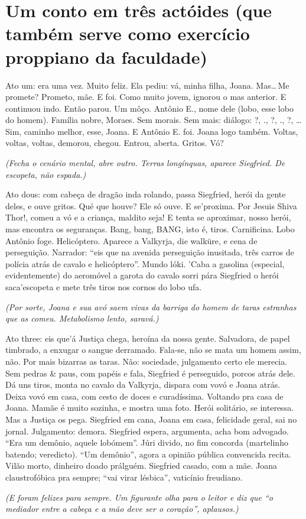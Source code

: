 \chapter[Um conto em três actóides]{Um conto em três actóides (que também serve como exercício proppiano da faculdade)}

Ato um: era uma vez. Muito feliz. Ela pediu: vá, minha filha, Joana. Mas\ldots\,Me promete? Prometo, mãe. E foi. Como muito jovem, ignorou o mas anterior. E continuou indo. Então parou. Um môço. Antônio E., nome dele (lobo, esse lobo do homem). Família nobre, Moraes. Sem morais. Sem mais: diálogo: ?, ., ?, ., ?, \ldots\,Sim, caminho melhor, esse, Joana. E Antônio E. foi. Joana logo também. Voltas, voltas, voltas, demorou, chegou. Entrou, aberta. Gritos. Vó?

\begin{center}
\emph{(Fecha o cenário mental, abre outro. Terras longínquas, aparece Siegfried. De escopeta, não espada.)}
\end{center}

Ato dous: com cabeça de dragão inda rolando, passa Siegfried, herói da gente deles, e ouve gritos. Qué que houve? Ele só ouve. E se'proxima. Por Jesuis Shiva Thor!, comeu a vó e a criança, maldito seja! E tenta se aproximar, nosso herói, mas encontra os seguranças. Bang, bang, BANG, isto é, tiros. Carnificina. Lobo Antônio foge. Helicóptero. Aparece a Valkyrja, die walküre, e cena de perseguição. Narrador: ``eis que na avenida perseguição inusitada, três carros de polícia atrás de cavalo e helicóptero''. Mundo lóki. 'Caba a gasolina (especial, evidentemente) do aeromóvel a garota do cavalo sorri pára Siegfried o herói saca'escopeta e mete três tiros nos cornos do lobo ufa.

\begin{center}
\emph{(Por sorte, Joana e sua avó saem vivas da barriga do homem de taras estranhas que as comeu. Metabolismo lento, saravá.)}
\end{center}

Ato three: eis que'á Justiça chega, heroína da nossa gente. Salvadora, de papel timbrado, a enxugar o sangue derramado. Fala-se, não se mata um homem assim, não. Por mais bizarras as taras. Não: sociedade, julgamento certo ele merecia. Sem pedras \& paus, com papéis e fala, Siegfried é perseguido, porcos atrás dele. Dá uns tiros, monta no cavalo da Valkyrja, dispara com vovó e Joana atrás. Deixa vovó em casa, com cesto de doces e curadíssima. Voltando pra casa de Joana. Mamãe é muito sozinha, e mostra uma foto. Herói solitário, se interessa. Mas a Justiça os pega. Siegfried em cana, Joana em casa, felicidade geral, sai no jornal. Julgamento: demora. Siegfried espera, argumenta, acha bom advogado. ``Era um demônio, aquele lobómem''. Júri divido, no fim concorda (martelinho batendo; veredicto). ``Um demônio'', agora a opinião pública convencida recita. Vilão morto, dinheiro doado prálguém. Siegfried casado, com a mãe. Joana claustrofóbica pra sempre; ``vai virar lésbica'', vaticínio freudiano.

\begin{center}
\emph{(E foram felizes para sempre. Um figurante olha para o leitor e diz que ``o mediador entre a cabeça e a mão deve ser o coração'', aplausos.)}
\end{center}
